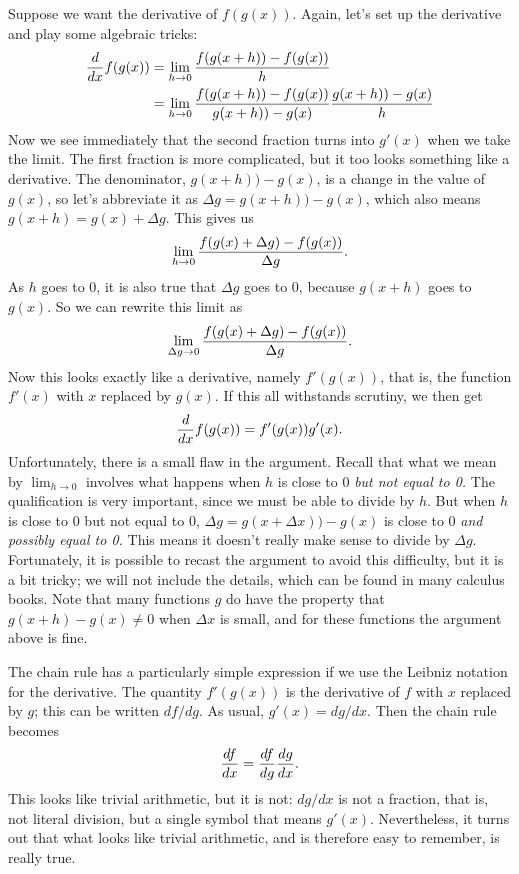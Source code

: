 Suppose we want the derivative of $f(g(x))$.
Again, let's set up the derivative and play some algebraic tricks:
\begin{align*}
\frac{d}{dx} f(g(x)) &=\lim_{h\to0} \frac{f(g(x+h))-f(g(x))}{h} \\
&=\lim_{h\to0} \frac{f(g(x+h))-f(g(x))}{g(x+h))-g(x)} \frac{g(x+h))-g(x)}{h} \\
\end{align*}
Now we see immediately that the second fraction turns into $g'(x)$
when we take the limit. The first fraction is more complicated, but it
too looks something like a derivative. The denominator, $g(x+h))-g(x)$, is a change in the value of $g(x)$, so let's abbreviate
it as $\Delta g=g(x+h))-g(x)$, which also means $g(x+h)=g(x)+\Delta g$. This gives
us
\[
\lim_{h\to0} {f(g(x)+\Delta g)-f(g(x))\over \Delta g}.
\]
As $h$ goes to 0, it is also true that $\Delta g$ goes to 0,
because $g(x+h)$ goes to $g(x)$. So we can rewrite this limit
as
$$\lim_{\Delta g\to0} {f(g(x)+\Delta g)-f(g(x))\over \Delta g}.$$
Now this looks exactly like a derivative, namely $f'(g(x))$, that is,
the function $f'(x)$ with $x$ replaced by $g(x)$. If this all
withstands scrutiny, we then get
$${d\over dx}f(g(x))=f'(g(x))g'(x).$$
Unfortunately, there is a small flaw in the argument. Recall that what
we mean by $\lim_{h\to0}$ involves what happens when $h$
is close to 0 {\it but not equal to 0.} The qualification is very
important, since we must be able to divide by $h$.
But when $h$ is close to 0 but not equal to 0,
$\Delta g=g(x+\Delta
x))-g(x)$ is close to 0 {\it and possibly equal to 0.} This means it
doesn't really make sense to divide by $\Delta g$.
Fortunately, it is possible to recast the argument to avoid this
difficulty, but it is a bit tricky; we will not include the details,
which can be found in many calculus books. Note that many functions
$g$ do have the property that $g(x+h)-g(x)\not=0$ when $\Delta
x$ is small, and for these functions the argument above is fine.

The chain rule has a particularly simple expression if we use the
Leibniz notation for the derivative. The quantity $f'(g(x))$ is the
derivative of $f$ with $x$ replaced by $g$; this can be written 
$df/dg$. As usual, $g'(x)=dg/dx$. Then the chain rule becomes
$${df\over dx} = {df\over dg}{dg\over dx}.$$
This looks like trivial arithmetic, but it is not: $dg/dx$ is not a
fraction, that is, not literal division, but a single symbol that
means $g'(x)$. Nevertheless, it turns out that what looks like trivial
arithmetic, and is therefore easy to remember, is really true.

